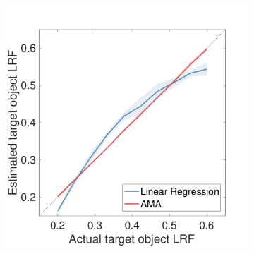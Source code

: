 \documentclass{jov}
\providecommand{\DIFaddbeginFL}{} %
\providecommand{\DIFaddendFL}{} %
\providecommand{\DIFdelbeginFL}{} %
\providecommand{\DIFdelendFL}{} %
\newcommand{\DIFscaledelfig}{0.5}
\newlength{\DIFdelgraphicswidth} %
\newlength{\DIFdelgraphicsheight} %
\newcommand{\DIFaddincludegraphics}[2][]{{\color{blue}\fbox{\DIFOincludegraphics[#1]{#2}}}} %
\newcommand{\DIFdelincludegraphics}[2][]{%
\sbox{\DIFdelgraphicsbox}{\DIFOincludegraphics[#1]{#2}}%
\settoboxwidth{\DIFdelgraphicswidth}{\DIFdelgraphicsbox} %
\settoboxtotalheight{\DIFdelgraphicsheight}{\DIFdelgraphicsbox} %
\scalebox{\DIFscaledelfig}{%
\parbox[b]{\DIFdelgraphicswidth}{\usebox{\DIFdelgraphicsbox}\\[-\baselineskip] \rule{\DIFdelgraphicswidth}{0em}}\llap{\resizebox{\DIFdelgraphicswidth}{\DIFdelgraphicsheight}{%
\setlength{\unitlength}{\DIFdelgraphicswidth}%
\begin{picture}(1,1)%
\thicklines\linethickness{2pt} %
{\color[rgb]{1,0,0}\put(0,0){\framebox(1,1){}}}%
{\color[rgb]{1,0,0}\put(0,0){\line( 1,1){1}}}%
{\color[rgb]{1,0,0}\put(0,1){\line(1,-1){1}}}%
\end{picture}%
}\hspace*{3pt}}} %
} %
\DeclareRobustCommand{\DIFaddbeginFL}{\DIFOaddbeginFL \let\includegraphics\DIFaddincludegraphics} %
\DeclareRobustCommand{\DIFaddendFL}{\DIFOaddendFL \let\includegraphics\DIFOincludegraphics} %
\DeclareRobustCommand{\DIFdelbeginFL}{\DIFOdelbeginFL \let\includegraphics\DIFdelincludegraphics} %
\DeclareRobustCommand{\DIFdelendFL}{\DIFOaddendFL \let\includegraphics\DIFOincludegraphics} %
\begin{document}
\begin{figure}
\begin{subfigure}[b]{0.22 \textwidth}
        \label{fig:case2RFResponseIsomer}
    \end{subfigure}
            \begin{subfigure}[b]{0.22 \textwidth}
        \caption{\DIFdelbeginFL %
\DIFdelendFL \DIFaddbeginFL {}  \DIFaddendFL \newline {}}
        \includegraphics[width=\textwidth, trim={0 0 0 1.5cm},clip]{../FiguresDraft5/Figure11/Figure11_c.pdf}
        \label{fig:case2ContrastEstimates}
    \end{subfigure}
            \begin{subfigure}[b]{0.22 \textwidth}
        \caption{  \newline {}}

\end{subfigure}
\end{figure}
\end{document}
